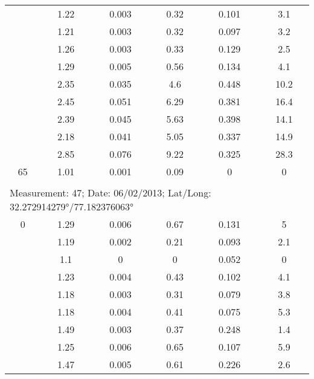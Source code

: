 \begin{longtable}{cccccc}
		& 1.22  & 0.003 & 0.32  & 0.101 & 3.1 \\
		
		& 1.21  & 0.003 & 0.32  & 0.097 & 3.2 \\
		
		& 1.26  & 0.003 & 0.33  & 0.129 & 2.5 \\
		
		& 1.29  & 0.005 & 0.56  & 0.134 & 4.1 \\
		
		& 2.35  & 0.035 & 4.6   & 0.448 & 10.2 \\
		
		& 2.45  & 0.051 & 6.29  & 0.381 & 16.4 \\
		
		& 2.39  & 0.045 & 5.63  & 0.398 & 14.1 \\
		
		& 2.18  & 0.041 & 5.05  & 0.337 & 14.9 \\
		
		& 2.85  & 0.076 & 9.22  & 0.325 & 28.3 \\
		
		65    & 1.01  & 0.001 & 0.09  & 0     & 0 \\ \\

		\multicolumn{6}{l}{Measurement: 47; Date: 06/02/2013;
			Lat/Long: 32.272914279°/77.182376063°} \\		
		\midrule
		0     & 1.29  & 0.006 & 0.67  & 0.131 & 5 \\
		
		& 1.19  & 0.002 & 0.21  & 0.093 & 2.1 \\
		
		& 1.1   & 0     & 0     & 0.052 & 0 \\
		
		& 1.23  & 0.004 & 0.43  & 0.102 & 4.1 \\
		
		& 1.18  & 0.003 & 0.31  & 0.079 & 3.8 \\
		
		& 1.18  & 0.004 & 0.41  & 0.075 & 5.3 \\
		
		& 1.49  & 0.003 & 0.37  & 0.248 & 1.4 \\
		
		& 1.25  & 0.006 & 0.65  & 0.107 & 5.9 \\
		
		& 1.47  & 0.005 & 0.61  & 0.226 & 2.6 \\
		

\end{longtable}
